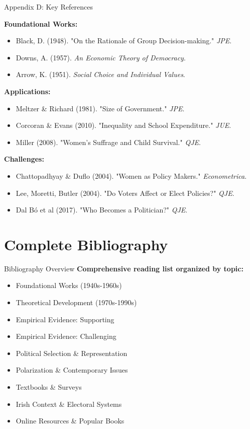 \documentclass[10pt]{beamer}
\begin{document}
\begin{frame}[label=bibliography]{Appendix D: Key References}
\hypertarget{bibliography}{}
\footnotesize

\textbf{Foundational Works:}
\begin{itemize}
\item Black, D. (1948). "On the Rationale of Group Decision-making." \emph{JPE}.
\item Downs, A. (1957). \emph{An Economic Theory of Democracy}.
\item Arrow, K. (1951). \emph{Social Choice and Individual Values}.
\end{itemize}


\textbf{Applications:}
\begin{itemize}
\item Meltzer \& Richard (1981). "Size of Government." \emph{JPE}.
\item Corcoran \& Evans (2010). "Inequality and School Expenditure." \emph{JUE}.
\item Miller (2008). "Women's Suffrage and Child Survival." \emph{QJE}.
\end{itemize}


\textbf{Challenges:}
\begin{itemize}
\item Chattopadhyay \& Duflo (2004). "Women as Policy Makers." \emph{Econometrica}.
\item Lee, Moretti, Butler (2004). "Do Voters Affect or Elect Policies?" \emph{QJE}.
\item Dal Bó et al (2017). "Who Becomes a Politician?" \emph{QJE}.
\end{itemize}

\end{frame}


\section*{Complete Bibliography}

\begin{frame}{Bibliography Overview}
\textbf{Comprehensive reading list organized by topic:}


\begin{itemize}
\item Foundational Works (1940s-1960s)
\item Theoretical Development (1970s-1990s)
\item Empirical Evidence: Supporting
\item Empirical Evidence: Challenging
\item Political Selection \& Representation
\item Polarization \& Contemporary Issues
\item Textbooks \& Surveys
\item Irish Context \& Electoral Systems
\item Online Resources \& Popular Books
\end{itemize}
\end{frame}
\end{document}
